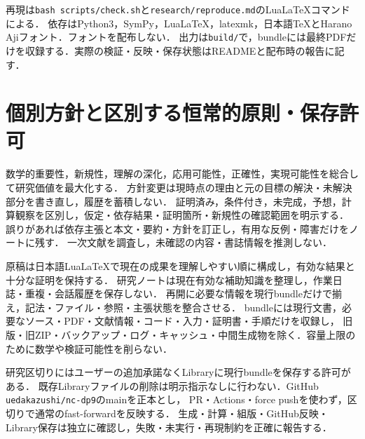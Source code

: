 \documentclass[11pt,a4paper]{ltjsarticle}
\begin{document}
再現は\texttt{bash scripts/check.sh}と\texttt{research/reproduce.md}のLuaLaTeXコマンドによる．
依存はPython3，SymPy，LuaLaTeX，latexmk，日本語TeXとHarano Ajiフォント．フォントを配布しない．
出力は\texttt{build/}で，bundleには最終PDFだけを収録する．実際の検証・反映・保存状態はREADMEと配布時の報告に記す．

\section{個別方針と区別する恒常的原則・保存許可}
数学的重要性，新規性，理解の深化，応用可能性，正確性，実現可能性を総合して研究価値を最大化する．
方針変更は現時点の理由と元の目標の解決・未解決部分を書き直し，履歴を蓄積しない．
証明済み，条件付き，未完成，予想，計算観察を区別し，仮定・依存結果・証明箇所・新規性の確認範囲を明示する．
誤りがあれば依存主張と本文・要約・方針を訂正し，有用な反例・障害だけをノートに残す．
一次文献を調査し，未確認の内容・書誌情報を推測しない．

原稿は日本語LuaLaTeXで現在の成果を理解しやすい順に構成し，有効な結果と十分な証明を保持する．
研究ノートは現在有効な補助知識を整理し，作業日誌・重複・会話履歴を保存しない．
再開に必要な情報を現行bundleだけで揃え，記法・ファイル・参照・主張状態を整合させる．
bundleには現行文書，必要なソース・PDF・文献情報・コード・入力・証明書・手順だけを収録し，
旧版・旧ZIP・バックアップ・ログ・キャッシュ・中間生成物を除く．容量上限のために数学や検証可能性を削らない．

研究区切りにはユーザーの追加承諾なくLibraryに現行bundleを保存する許可がある．
既存Libraryファイルの削除は明示指示なしに行わない．GitHub \texttt{uedakazushi/nc-dp9}のmainを正本とし，
PR・Actions・force pushを使わず，区切りで通常のfast-forwardを反映する．
生成・計算・組版・GitHub反映・Library保存は独立に確認し，失敗・未実行・再現制約を正確に報告する．
\end{document}
